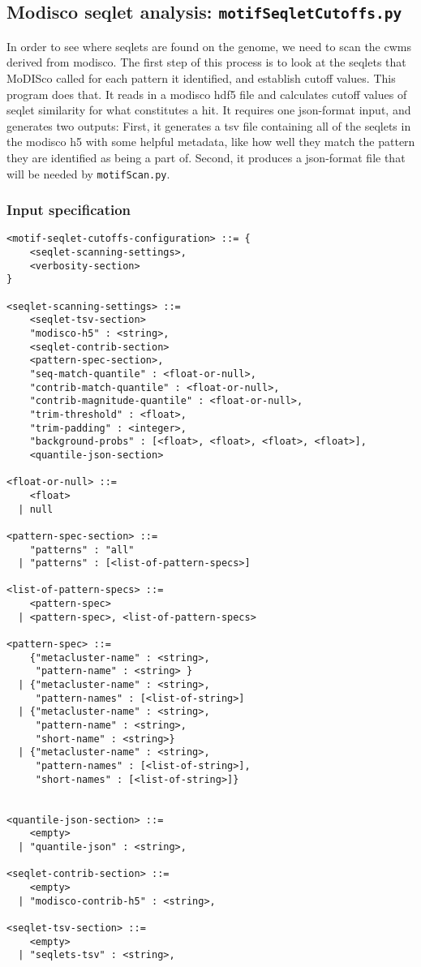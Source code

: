 \documentclass{article}
\begin{document}
\subsection{Modisco seqlet analysis: \texttt{motifSeqletCutoffs.py}}
In order to see where seqlets are found on the genome, we need to scan the cwms derived from modisco.
The first step of this process is to look at the seqlets that MoDISco called for each pattern
it identified, and establish cutoff values.
This program does that. 
It reads in a modisco hdf5 file and calculates cutoff values of seqlet similarity for
what constitutes a hit.
It requires one json-format input, and generates two outputs: First, it generates a tsv
file containing all of the seqlets in the modisco h5 with some helpful metadata,
like how well they match the pattern they are identified as being a part of.
Second, it produces a json-format file that will be needed by \texttt{motifScan.py}.

\subsubsection{Input specification}
\begin{lstlisting}
<motif-seqlet-cutoffs-configuration> ::= {
    <seqlet-scanning-settings>,
    <verbosity-section>
}

<seqlet-scanning-settings> ::=
    <seqlet-tsv-section>
    "modisco-h5" : <string>,
    <seqlet-contrib-section>
    <pattern-spec-section>,
    "seq-match-quantile" : <float-or-null>,
    "contrib-match-quantile" : <float-or-null>,
    "contrib-magnitude-quantile" : <float-or-null>,
    "trim-threshold" : <float>,
    "trim-padding" : <integer>,
    "background-probs" : [<float>, <float>, <float>, <float>],
    <quantile-json-section>

<float-or-null> ::=
    <float>
  | null

<pattern-spec-section> ::=
    "patterns" : "all"
  | "patterns" : [<list-of-pattern-specs>]

<list-of-pattern-specs> ::=
    <pattern-spec>
  | <pattern-spec>, <list-of-pattern-specs>

<pattern-spec> ::= 
    {"metacluster-name" : <string>,
     "pattern-name" : <string> }
  | {"metacluster-name" : <string>,
     "pattern-names" : [<list-of-string>]
  | {"metacluster-name" : <string>,
     "pattern-name" : <string>,
     "short-name" : <string>}
  | {"metacluster-name" : <string>,
     "pattern-names" : [<list-of-string>],
     "short-names" : [<list-of-string>]}


<quantile-json-section> ::=
    <empty>
  | "quantile-json" : <string>,

<seqlet-contrib-section> ::=
    <empty>
  | "modisco-contrib-h5" : <string>,

<seqlet-tsv-section> ::= 
    <empty>
  | "seqlets-tsv" : <string>,
\end{lstlisting}
\end{document}
